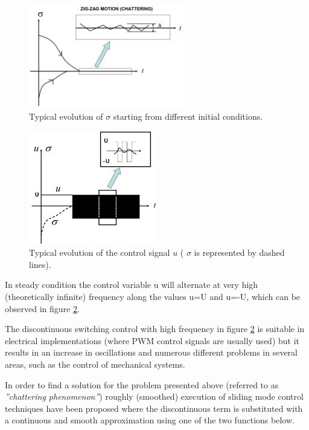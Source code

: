 \documentclass{thesisreport}
\begin{document}
\begin{figure}[h]
\centering
\includegraphics[width=0.6\textwidth]{Images/Control/first_order_sliding_mode_control}
\caption{Typical evolution of $\sigma$ starting from different initial conditions. \cite{DeCarlo2008}}
\label{sigma_evolution}
\end{figure}

\newpage

\begin{figure}[h]
\centering
\includegraphics[width=0.5\textwidth]{Images/Control/first_order_sliding_mode_control_b}
\caption{Typical evolution of the control signal $u$ ( $\sigma$ is represented by dashed lines). \cite{DeCarlo2008}}
\label{control_evolution}
\end{figure}


\noindent In steady condition the control variable u will alternate at very high (theoretically infinite) frequency along the values u=U
and u=-U, which can be observed in figure \ref{control_evolution}.



\noindent The discontinuous switching control with high frequency  in figure \ref{control_evolution} is suitable in electrical implementations (where PWM control signals are usually used) but it results in an increase in oscillations and numerous different problems in several areas, such as the control of mechanical systems.


In order to find a solution for the problem presented above (referred to as \textit{”chattering phenomenon”}) roughly (smoothed) execution of sliding mode control techniques have been proposed where the discontinuous  term is substituted with a  continuous and smooth approximation using one of the two functions below.
\end{document}
